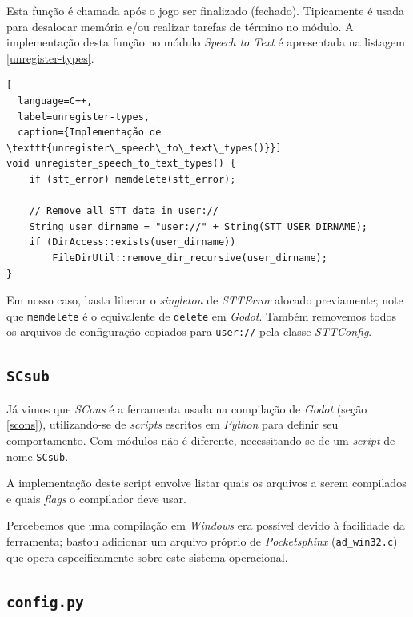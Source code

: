Esta função é chamada após o jogo ser finalizado (fechado). Tipicamente é usada para desalocar memória e/ou realizar tarefas de término no módulo. A implementação desta função no módulo \textit{Speech to Text} é apresentada na listagem \ref{unregister-types}.

\begin{lstlisting}[
  language=C++,
  label=unregister-types,
  caption={Implementação de \texttt{unregister\_speech\_to\_text\_types()}}]
void unregister_speech_to_text_types() {
    if (stt_error) memdelete(stt_error);

    // Remove all STT data in user://
    String user_dirname = "user://" + String(STT_USER_DIRNAME);
    if (DirAccess::exists(user_dirname))
        FileDirUtil::remove_dir_recursive(user_dirname);
}
\end{lstlisting}

Em nosso caso, basta liberar o \textit{singleton} de \textit{STTError} alocado previamente; note que \texttt{memdelete} é o equivalente de \texttt{delete} em \textit{Godot}. Também removemos todos os arquivos de configuração copiados para \texttt{user://} pela classe \textit{STTConfig}.


\subsection{\texttt{SCsub}}

Já vimos que \textit{SCons} é a ferramenta usada na compilação de \textit{Godot} (seção \ref{scons}), utilizando-se de \textit{scripts} escritos em \textit{Python} para definir seu comportamento. Com módulos não é diferente, necessitando-se de um \textit{script} de nome \texttt{SCsub}.

A implementação deste script envolve listar quais os arquivos a serem compilados e quais \textit{flags} o compilador deve usar.

Percebemos que uma compilação em \textit{Windows} era possível devido à facilidade da ferramenta; bastou adicionar um arquivo próprio de \textit{Pocketsphinx} (\texttt{ad\_win32.c}) que opera especificamente sobre este sistema operacional.


\subsection{\texttt{config.py}}

